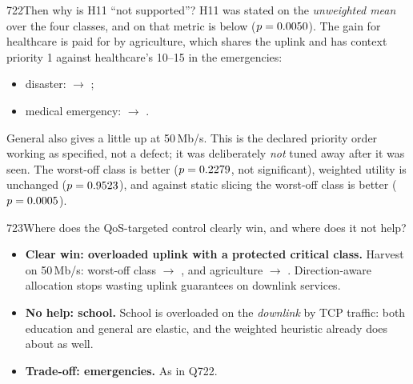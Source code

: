 \begin{qa}{722}{Then why is H11 ``not supported''?}
H11 was stated on the \emph{unweighted mean} over the four classes, and on that metric  is
\NQDiffProposedMeanSla{} below  ($p=0.0050$). The gain for healthcare is paid for by
agriculture, which shares the uplink and has context priority 1 against healthcare's 10--15 in the emergencies:
\begin{itemize}
\item disaster: \NQCondDisasterProposedAgSla{} $\rightarrow$ \NQCondDisasterQosAdaptiveAgSla;
\item medical emergency: \NQCondMedicalEmergencyProposedAgSla{} $\rightarrow$ \NQCondMedicalEmergencyQosAdaptiveAgSla.
\end{itemize}
General also gives a little up at 50\,Mb/s. This is the declared priority order working as specified, not a defect;
it was deliberately \emph{not} tuned away after it was seen. The worst-off class is \NQDiffProposedMinSla{} better
($p=0.2279$, not significant), weighted utility is unchanged ($p=0.9523$), and against static
slicing the worst-off class is \NQDiffStaticMinSla{} better ($p=0.0005$).
\end{qa}

\begin{qa}{723}{Where does the QoS-targeted control clearly win, and where does it not help?}
\begin{itemize}
\item \textbf{Clear win: overloaded uplink with a protected critical class.} Harvest on 50\,Mb/s: worst-off class
\NQCondHarvestFiveZeromProposedMinSla{} $\rightarrow$ \NQCondHarvestFiveZeromQosAdaptiveMinSla, and agriculture
\NQCondHarvestFiveZeromProposedAgSla{} $\rightarrow$ \NQCondHarvestFiveZeromQosAdaptiveAgSla. Direction-aware
allocation stops wasting uplink guarantees on downlink services.
\item \textbf{No help: school.} School is overloaded on the \emph{downlink} by TCP traffic: both education and general
are elastic, and the weighted heuristic already does about as well.
\item \textbf{Trade-off: emergencies.} As in Q722.
\end{itemize}
\end{qa}

